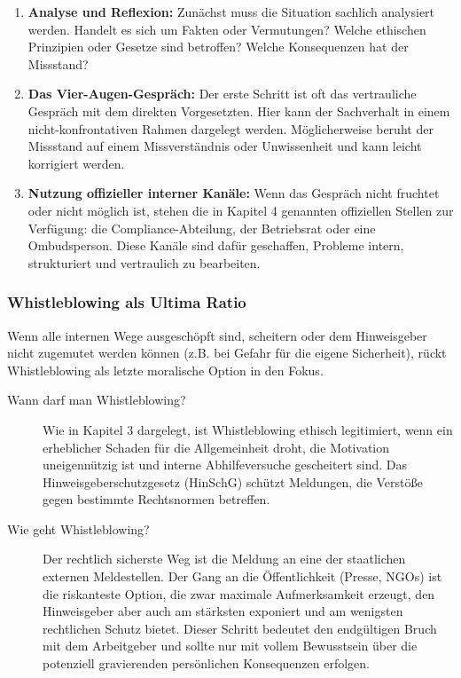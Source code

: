 \documentclass[
    12pt,               %
    a4paper,            %
    ngerman             %
]{scrartcl}
\begin{document}
\begin{enumerate}
    \item \textbf{Analyse und Reflexion:} Zunächst muss die Situation sachlich analysiert werden. Handelt es sich um Fakten oder Vermutungen? Welche ethischen Prinzipien oder Gesetze sind betroffen? Welche Konsequenzen hat der Missstand?
    \item \textbf{Das Vier-Augen-Gespräch:} Der erste Schritt ist oft das vertrauliche Gespräch mit dem direkten Vorgesetzten. Hier kann der Sachverhalt in einem nicht-konfrontativen Rahmen dargelegt werden. Möglicherweise beruht der Missstand auf einem Missverständnis oder Unwissenheit und kann leicht korrigiert werden.
    \item \textbf{Nutzung offizieller interner Kanäle:} Wenn das Gespräch nicht fruchtet oder nicht möglich ist, stehen die in Kapitel 4 genannten offiziellen Stellen zur Verfügung: die Compliance-Abteilung, der Betriebsrat oder eine Ombudsperson. Diese Kanäle sind dafür geschaffen, Probleme intern, strukturiert und vertraulich zu bearbeiten.
\end{enumerate}

\subsubsection*{Whistleblowing als Ultima Ratio}
Wenn alle internen Wege ausgeschöpft sind, scheitern oder dem Hinweisgeber nicht zugemutet werden können (z.B. bei Gefahr für die eigene Sicherheit), rückt Whistleblowing als letzte moralische Option in den Fokus.
\begin{description}
    \item[Wann darf man Whistleblowing?] Wie in Kapitel 3 dargelegt, ist Whistleblowing ethisch legitimiert, wenn ein erheblicher Schaden für die Allgemeinheit droht, die Motivation uneigennützig ist und interne Abhilfeversuche gescheitert sind. Das Hinweisgeberschutzgesetz (HinSchG) schützt Meldungen, die Verstöße gegen bestimmte Rechtsnormen betreffen.
    \item[Wie geht Whistleblowing?] Der rechtlich sicherste Weg ist die Meldung an eine der staatlichen externen Meldestellen. Der Gang an die Öffentlichkeit (Presse, NGOs) ist die riskanteste Option, die zwar maximale Aufmerksamkeit erzeugt, den Hinweisgeber aber auch am stärksten exponiert und am wenigsten rechtlichen Schutz bietet. Dieser Schritt bedeutet den endgültigen Bruch mit dem Arbeitgeber und sollte nur mit vollem Bewusstsein über die potenziell gravierenden persönlichen Konsequenzen erfolgen.
\end{description}
\end{document}
